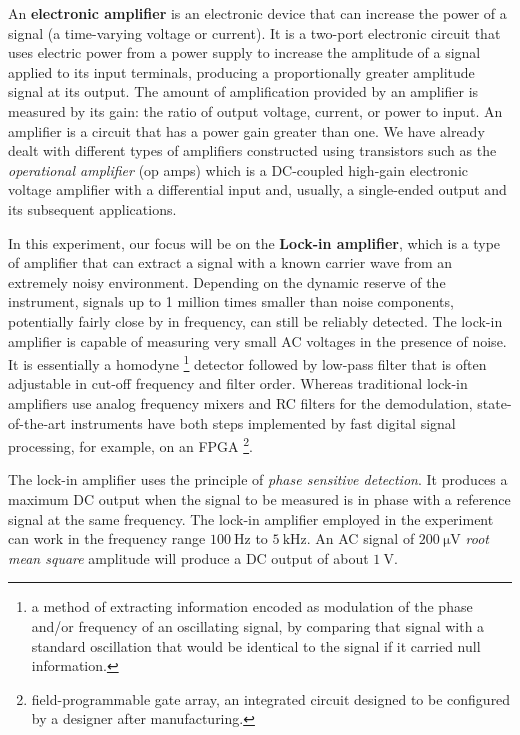 \documentclass[%
 reprint,
nofootinbib,
 amsmath,amssymb,
 aps,
]{revtex4-2}
\begin{document}
    \par
    An \textbf{electronic amplifier} is an electronic device that can increase the power of a signal (a time-varying voltage or current). It is a two-port electronic circuit that uses electric power from a power supply to increase the amplitude of a signal applied to its input terminals, producing a proportionally greater amplitude signal at its output. The amount of amplification provided by an amplifier is measured by its gain: the ratio of output voltage, current, or power to input. An amplifier is a circuit that has a power gain greater than one. We have already dealt with different types of amplifiers constructed using transistors such as the \textit{operational amplifier} (op amps) which is a DC-coupled high-gain electronic voltage amplifier with a differential input and, usually, a single-ended output and its subsequent applications.
    \par
    In this experiment, our focus will be on the \textbf{Lock-in amplifier}, which is a type of amplifier that can extract a signal with a known carrier wave from an extremely noisy environment. Depending on the dynamic reserve of the instrument, signals up to 1 million times smaller than noise components, potentially fairly close by in frequency, can still be reliably detected. The lock-in amplifier is capable of measuring very small AC voltages in the presence of noise. It is essentially a homodyne \footnote{a method of extracting information encoded as modulation of the phase and/or frequency of an oscillating signal, by comparing that signal with a standard oscillation that would be identical to the signal if it carried null information.} detector followed by low-pass filter that is often adjustable in cut-off frequency and filter order. Whereas traditional lock-in amplifiers use analog frequency mixers and RC filters for the demodulation, state-of-the-art instruments have both steps implemented by fast digital signal processing, for example, on an FPGA \footnote{field-programmable gate array, an integrated circuit designed to be configured by a designer after manufacturing.}.
    \par
    The lock-in amplifier uses the principle of \textit{phase sensitive detection}. It produces a maximum DC output when the signal to be measured is in phase with a reference signal at the same frequency. The lock-in amplifier employed in the experiment can work in the frequency range $\SI{100}{\hertz}$ to $\SI{5}{\kilo \hertz}$. An AC signal of $\SI{200}{\micro \volt}$ \textit{root mean square} amplitude will produce a DC output of about $\SI{1}{\volt}$. 
\end{document}

